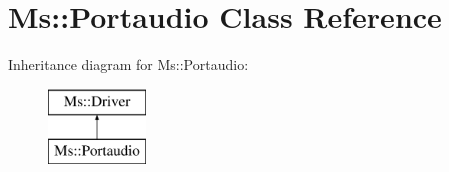 \hypertarget{class_ms_1_1_portaudio}{}\section{Ms\+:\+:Portaudio Class Reference}
\label{class_ms_1_1_portaudio}
Inheritance diagram for Ms\+:\+:Portaudio\+:\begin{figure}[H]
\begin{center}
\leavevmode
\includegraphics[height=2.000000cm]{class_ms_1_1_portaudio}
\end{center}
\end{figure}

